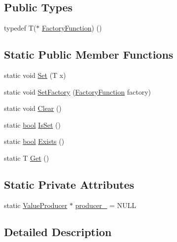 \subsection*{Public Types}
\begin{DoxyCompactItemize}
\item 
typedef T($\ast$ \hyperlink{classtesting_1_1DefaultValue_a5763a68d75e0a4c97fcaff708e2df803}{Factory\+Function}) ()
\end{DoxyCompactItemize}
\subsection*{Static Public Member Functions}
\begin{DoxyCompactItemize}
\item 
static void \hyperlink{classtesting_1_1DefaultValue_a5698814be364b9ac26e72ad37d6ff14e}{Set} (T x)
\item 
static void \hyperlink{classtesting_1_1DefaultValue_af012445ff5b194940c1427529707cb91}{Set\+Factory} (\hyperlink{classtesting_1_1DefaultValue_a5763a68d75e0a4c97fcaff708e2df803}{Factory\+Function} factory)
\item 
static void \hyperlink{classtesting_1_1DefaultValue_a8163037b60311177cb211f070c512ee3}{Clear} ()
\item 
static \hyperlink{classbool}{bool} \hyperlink{classtesting_1_1DefaultValue_ad49febe2c944cbbd06451ba7d0366ca1}{Is\+Set} ()
\item 
static \hyperlink{classbool}{bool} \hyperlink{classtesting_1_1DefaultValue_aec1ff9b510af7dbb86c837fd2409fd70}{Exists} ()
\item 
static T \hyperlink{classtesting_1_1DefaultValue_a4dc6dfee4cbc9cdb36f5c9cde5cf2b83}{Get} ()
\end{DoxyCompactItemize}
\subsection*{Static Private Attributes}
\begin{DoxyCompactItemize}
\item 
static \hyperlink{classtesting_1_1DefaultValue_1_1ValueProducer}{Value\+Producer} $\ast$ \hyperlink{classtesting_1_1DefaultValue_a69d60d7538ccf71d9f47164320a3bf28}{producer\+\_\+} = N\+U\+LL
\end{DoxyCompactItemize}


\subsection{Detailed Description}

